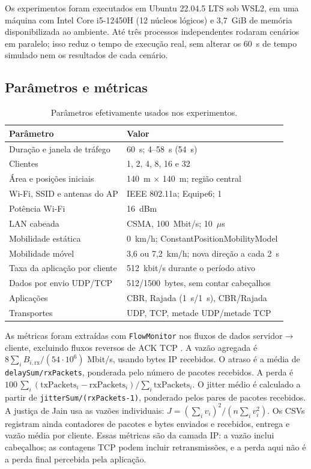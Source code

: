 \documentclass[12pt]{article}
\begin{document}
Os experimentos foram executados em Ubuntu 22.04.5 LTS sob WSL2, em uma
máquina com Intel Core i5-12450H (12 núcleos lógicos) e 3,7~GiB de
memória disponibilizada ao ambiente. Até três processos independentes
rodaram cenários em paralelo; isso reduz o tempo de execução real, sem alterar
os 60~s de tempo simulado nem os resultados de cada cenário.

\subsection{Parâmetros e métricas}
\begin{table}[ht]
\centering\small
\caption{Parâmetros efetivamente usados nos experimentos.}
\label{tab:parametros}
\begin{tabular}{ll}
\toprule
Parâmetro & Valor \\
\midrule
Duração e janela de tráfego & 60~s; 4--58~s (54~s) \\
Clientes & 1, 2, 4, 8, 16 e 32 \\
Área e posições iniciais & 140~m \(\times\) 140~m; região central \\
Wi-Fi, SSID e antenas do AP & IEEE 802.11a; Equipe6; 1 \\
Potência Wi-Fi & 16~dBm \\
LAN cabeada & CSMA, 100~Mbit/s; 10~\(\mu\)s \\
Mobilidade estática & 0~km/h; ConstantPositionMobilityModel \\
Mobilidade móvel & 3,6 ou 7,2~km/h; nova direção a cada 2~s \\
Taxa da aplicação por cliente & 512~kbit/s durante o período ativo \\
Dados por envio UDP/TCP & 512/1500~bytes, sem contar cabeçalhos \\
Aplicações & CBR, Rajada (1~s/1~s), CBR/Rajada \\
Transportes & UDP, TCP, metade UDP/metade TCP \\
\bottomrule
\end{tabular}
\end{table}

As métricas foram extraídas com \texttt{FlowMonitor} nos fluxos de dados
servidor\(\rightarrow\)cliente, excluindo fluxos reversos de ACK TCP
\cite{flowmonitor}. A vazão agregada é \(8\sum_i B_{i,\mathrm{rx}}/(54\cdot
10^6)\) Mbit/s, usando bytes IP recebidos. O atraso é a média de
\texttt{delaySum/rxPackets}, ponderada pelo número de pacotes recebidos. A
perda é \(100\,\sum_i(\mathrm{txPackets}_i-\mathrm{rxPackets}_i)/
\sum_i\mathrm{txPackets}_i\). O jitter médio é calculado a partir de
\texttt{jitterSum/(rxPackets-1)}, ponderado pelos pares de pacotes recebidos.
A justiça de Jain usa as vazões individuais: \(J=(\sum_i v_i)^2/
(n\sum_i v_i^2)\). Os CSVs registram ainda contadores de pacotes e bytes
enviados e recebidos, entrega e vazão média por cliente. Essas métricas são
da camada IP: a vazão inclui cabeçalhos;
as contagens TCP podem incluir retransmissões, e a perda aqui não é a perda
final percebida pela aplicação.
\end{document}

